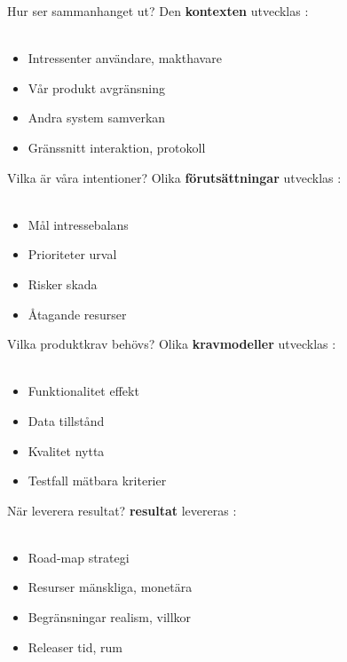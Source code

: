 \documentclass{simpleslides}
\begin{document}
\begin{Slide}{Hur ser sammanhanget ut?}
Den  \textbf{kontexten} utvecklas : \\~
\begin{itemize}
\item Intressenter \hfill användare, makthavare
\item Vår produkt  \hfill avgränsning
\item Andra system \hfill samverkan
\item Gränssnitt \hfill interaktion, protokoll
\end{itemize}
\end{Slide}


\begin{Slide}{Vilka är våra intentioner?}
Olika  \textbf{förutsättningar} utvecklas : \\~
\begin{itemize}
\item Mål \hfill intressebalans
\item Prioriteter  \hfill urval
\item Risker \hfill skada
\item Åtagande \hfill resurser
\end{itemize}
\end{Slide}

\begin{Slide}{Vilka produktkrav behövs?}
Olika  \textbf{kravmodeller} utvecklas : \\~
\begin{itemize}
\item Funktionalitet \hfill effekt
\item Data  \hfill tillstånd
\item Kvalitet \hfill nytta
\item Testfall \hfill mätbara kriterier
\end{itemize}
\end{Slide}


\begin{Slide}{När leverera resultat?}
 \textbf{resultat} levereras : \\~
\begin{itemize}
\item Road-map \hfill strategi
\item Resurser  \hfill mänskliga, monetära
\item Begränsningar \hfill realism, villkor
\item Releaser \hfill tid, rum
\end{itemize}
\end{Slide}
\end{document}
